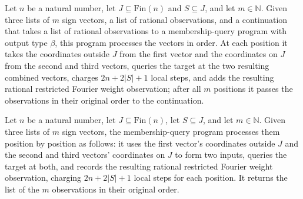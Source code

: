 \begin{definition}
\label{FABL.restrictedFourierWeightObservationBatchProgramWith}
\leanok
{}
Let $n$ be a natural number, let $J\subseteq\mathrm{Fin}(n)$ and $S\subseteq J$, and let
$m\in\mathbb N$. Given three lists of $m$ sign vectors, a list of rational observations,
and a continuation that takes a list of rational observations to a membership-query
program with output type $\beta$, this program processes the vectors in order. At each
position it takes the coordinates outside $J$ from the first vector and the coordinates
on $J$ from the second and third vectors, queries the target at the two resulting
combined vectors, charges $2n+2|S|+1$ local steps, and adds the resulting rational
restricted Fourier weight observation; after all $m$ positions it passes the
observations in their original order to the continuation.
\end{definition}

\begin{definition}
\label{FABL.restrictedFourierWeightObservationBatchProgram}
\leanok
{}
Let $n$ be a natural number, let $J\subseteq\mathrm{Fin}(n)$, let $S\subseteq J$, and
let $m\in\mathbb N$. Given three lists of $m$ sign vectors, the membership-query program
processes them position by position as follows: it uses the first vector's coordinates
outside $J$ and the second and third vectors' coordinates on $J$ to form two inputs,
queries the target at both, and records the resulting rational restricted Fourier weight
observation, charging $2n+2|S|+1$ local steps for each position. It returns the list of
the $m$ observations in their original order.
\end{definition}

